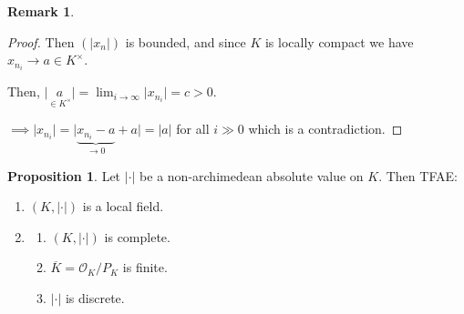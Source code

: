 \documentclass[openany]{amsbook}
\numberwithin{section}{chapter}
\theoremstyle{definition}
\newtheorem*{remark}{Remark}
\newtheorem{proposition}[theorem]{Proposition}
\begin{document}
\begin{remark}
\begin{enumerate}[label=\arabic*)]
\begin{proof}
            Then \((\vert x_n \vert)\) is bounded, and since \(K\) is locally compact we have \(x_{n_i} \to a\in K^\times\).

            Then, \(\vert \underset{\in K^\times}{a} \vert = \lim_{i \to \infty} \vert x_{n_i} \vert = c > 0\).

            \(\implies \vert x_{n_i} \vert = \vert \underbrace{x_{n_i} - a}_{\to 0} + a \vert = \vert a \vert\) for all \(i \gg 0\) which is a contradiction.

        \end{proof}
    \end{enumerate} 
\end{remark}

\begin{proposition}
    Let \(\vert \cdot \vert\) be a non-archimedean absolute value on \(K\). Then TFAE:

    \begin{enumerate}[label=\roman*)]
        \item \((K,\vert \cdot \vert)\) is a local field.
        \item
        \begin{enumerate}[label=\alph*)]
            \item \((K, \vert \cdot \vert)\) is complete.
            \item \(\overline{K} = \mathcal{O}_K / P_K\) is finite.
            \item \(\vert \cdot \vert\) is discrete. 
        \end{enumerate} 
    \end{enumerate} 
\end{proposition}
\end{document}
